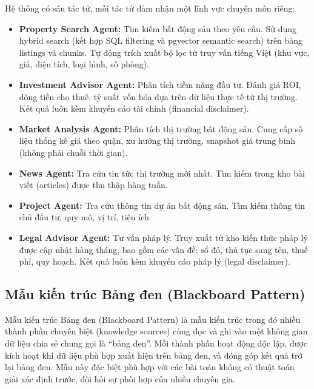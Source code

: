 Hệ thống có sáu tác tử, mỗi tác tử đảm nhận một lĩnh vực chuyên môn riêng:

\begin{itemize}
    \item \textbf{Property Search Agent:} Tìm kiếm bất động sản theo yêu cầu. Sử dụng hybrid search (kết hợp SQL filtering và pgvector semantic search) trên bảng listings và chunks. Tự động trích xuất bộ lọc từ truy vấn tiếng Việt (khu vực, giá, diện tích, loại hình, số phòng).

    \item \textbf{Investment Advisor Agent:} Phân tích tiềm năng đầu tư. Đánh giá ROI, dòng tiền cho thuê, tỷ suất vốn hóa dựa trên dữ liệu thực tế từ thị trường. Kết quả luôn kèm khuyến cáo tài chính (financial disclaimer).

    \item \textbf{Market Analysis Agent:} Phân tích thị trường bất động sản. Cung cấp số liệu thống kê giá theo quận, xu hướng thị trường, snapshot giá trung bình (không phải chuỗi thời gian).

    \item \textbf{News Agent:} Tra cứu tin tức thị trường mới nhất. Tìm kiếm trong kho bài viết (articles) được thu thập hàng tuần.

    \item \textbf{Project Agent:} Tra cứu thông tin dự án bất động sản. Tìm kiếm thông tin chủ đầu tư, quy mô, vị trí, tiện ích.

    \item \textbf{Legal Advisor Agent:} Tư vấn pháp lý. Truy xuất từ kho kiến thức pháp lý được cập nhật hàng tháng, bao gồm các vấn đề: sổ đỏ, thủ tục sang tên, thuế phí, quy hoạch. Kết quả luôn kèm khuyến cáo pháp lý (legal disclaimer).
\end{itemize}

\subsection{Mẫu kiến trúc Bảng đen (Blackboard Pattern)}

Mẫu kiến trúc Bảng đen (Blackboard Pattern) là mẫu kiến trúc trong đó nhiều thành phần chuyên biệt (knowledge sources) cùng đọc và ghi vào một không gian dữ liệu chia sẻ chung gọi là ``bảng đen''. Mỗi thành phần hoạt động độc lập, được kích hoạt khi dữ liệu phù hợp xuất hiện trên bảng đen, và đóng góp kết quả trở lại bảng đen. Mẫu này đặc biệt phù hợp với các bài toán không có thuật toán giải xác định trước, đòi hỏi sự phối hợp của nhiều chuyên gia.

